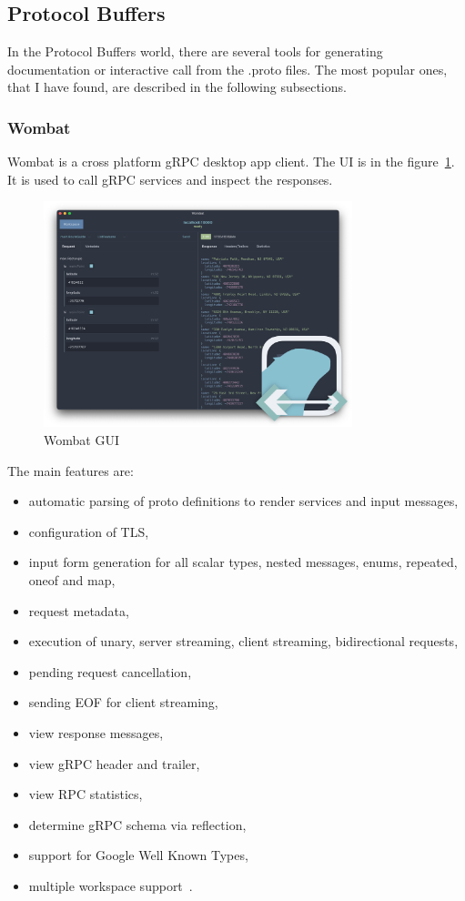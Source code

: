 \subsection{Protocol Buffers}
In the Protocol Buffers world, there are several tools for generating documentation or interactive call from the .proto files.
The most popular ones, that I have found, are described in the following subsections.

\subsubsection{Wombat}
Wombat is a cross platform gRPC desktop app client.
The UI is in the figure~\ref{fig:grpc-wombat}.
It is used to call gRPC services and inspect the responses.
\cite{grpc-wombat}

\begin{figure}[hbt!]
    \centering
    \captionsetup{justification=centering}
    \includegraphics[width=0.8\textwidth]{images/grpc/wombat}
    \caption{Wombat GUI~\cite{grpc-wombat}}
    \label{fig:grpc-wombat}
\end{figure}

The main features are:
\begin{itemize}
    \item automatic parsing of proto definitions to render services and input messages,
    \item configuration of TLS,
    \item input form generation for all scalar types, nested messages, enums, repeated, oneof and map,
    \item request metadata,
    \item execution of unary, server streaming, client streaming, bidirectional requests,
    \item pending request cancellation,
    \item sending EOF for client streaming,
    \item view response messages,
    \item view gRPC header and trailer,
    \item view RPC statistics,
    \item determine gRPC schema via reflection,
    \item support for Google Well Known Types,
    \item multiple workspace support~\cite{grpc-wombat}.
\end{itemize}

